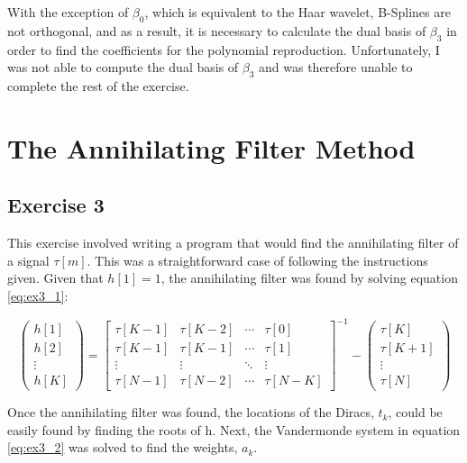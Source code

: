 \documentclass[a4paper]{article}
\begin{document}
With the exception of $\beta_0$, which is equivalent to the Haar wavelet, B-Splines are not orthogonal, and as a result, it is necessary to calculate the dual basis of $\beta_3$ in order to find the coefficients for the polynomial reproduction. Unfortunately, I was not able to compute the dual basis of $\beta_3$ and was therefore unable to complete the rest of the exercise.

\section{The Annihilating Filter Method}
\subsection{Exercise 3}

This exercise involved writing a program that would find the annihilating filter of a signal $\tau[m]$. This was a straightforward case of following the instructions given. Given that $h[1] = 1$, the annihilating filter was found by solving equation \ref{eq:ex3_1}:

\begin{equation}
\begin{pmatrix}
h[1] \\
h[2] \\
\vdots \\
h[K]
\end{pmatrix}
=
\begin{bmatrix}
\tau[K-1] & \tau[K-2] & \dotsb & \tau[0] \\
\tau[K-1] & \tau[K-1] & \dotsb & \tau[1] \\
\vdots & \vdots & \ddots & \vdots \\
\tau[N-1] & \tau[N-2] & \dotsb & \tau[N-K]
\end{bmatrix}^{-1}
-\begin{pmatrix}
\tau[K] \\
\tau[K+1] \\
\vdots \\
\tau[N]
\end{pmatrix}
\end{equation}
\label{eq:ex3_1}

Once the annihilating filter was found, the locations of the Diracs, $t_k$, could be easily found by finding the roots of h. Next, the Vandermonde system in equation \ref{eq:ex3_2} was solved to find the weights, $a_k$.
\end{document}
